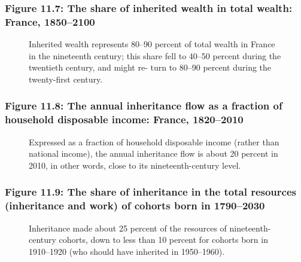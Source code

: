 \documentclass[t]{beamer}\usepackage[]{graphicx}\usepackage[]{color}
\begin{document}
\begin{frame}[label=Figure_11_7]
\frametitle{Figure 11.7: The share of inherited wealth in total wealth: France, 1850--2100}
\begin{figure}[t]
\begin{minipage}[b]{\textwidth}
\centering

\caption{Inherited wealth represents 80--90 percent of total wealth in France in the nineteenth century; this share fell to 40--50 percent during the twentieth century, and might re- turn to 80--90 percent during the twenty-first century.}
\end{minipage}
\end{figure}
\end{frame}


\begin{frame}[label=Figure_11_8]
\frametitle{Figure 11.8: The annual inheritance flow as a fraction of household disposable income: France, 1820--2010}
\begin{figure}[t]
\begin{minipage}[b]{\textwidth}
\centering

\caption{Expressed as a fraction of household disposable income (rather than national income), the annual inheritance flow is about 20 percent in 2010, in other words, close to its nineteenth-century level.}
\end{minipage}
\end{figure}
\end{frame}


\begin{frame}[label=Figure_11_9]
\frametitle{Figure 11.9: The share of inheritance in the total resources (inheritance and work) of cohorts born in 1790--2030}
\begin{figure}[t]
\begin{minipage}[b]{\textwidth}
\centering

\caption{Inheritance made about 25 percent of the resources of nineteenth-century cohorts, down to less than 10 percent for cohorts born in 1910--1920 (who should have inherited in 1950--1960).}
\end{minipage}
\end{figure}
\end{frame}
\end{document}
